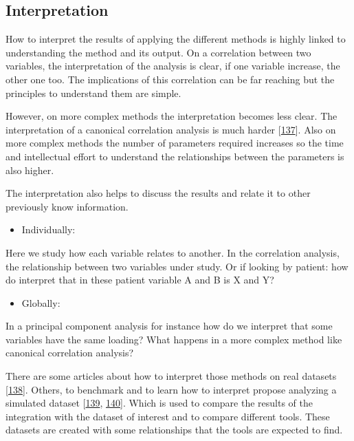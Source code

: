 \documentclass[
  a4paper,
]{book}
\providecommand{\tightlist}{%
  \setlength{\itemsep}{0pt}\setlength{\parskip}{0pt}}
\begin{document}
\hypertarget{interpretation}{%
\subsection{Interpretation}\label{interpretation}}

How to interpret the results of applying the different methods is highly linked to understanding the method and its output.
On a correlation between two variables, the interpretation of the analysis is clear, if one variable increase, the other one too.
The implications of this correlation can be far reaching but the principles to understand them are simple.

However, on more complex methods the interpretation becomes less clear.
The interpretation of a canonical correlation analysis is much harder {[}\protect\hyperlink{ref-sherry2005}{137}{]}.
Also on more complex methods the number of parameters required increases so the time and intellectual effort to understand the relationships between the parameters is also higher.

The interpretation also helps to discuss the results and relate it to other previously know information.

\begin{itemize}
\tightlist
\item
  Individually:
\end{itemize}

Here we study how each variable relates to another.
In the correlation analysis, the relationship between two variables under study.
Or if looking by patient: how do interpret that in these patient variable A and B is X and Y?

\begin{itemize}
\tightlist
\item
  Globally:
\end{itemize}

In a principal component analysis for instance how do we interpret that some variables have the same loading?
What happens in a more complex method like canonical correlation analysis?

There are some articles about how to interpret those methods on real datasets {[}\protect\hyperlink{ref-sherryConductingInterpretingCanonical1981}{138}{]}.
Others, to benchmark and to learn how to interpret propose analyzing a simulated dataset {[}\protect\hyperlink{ref-chung_multi-omics_2019}{139}, \protect\hyperlink{ref-martinez-mira_mosim_2018}{140}{]}.
Which is used to compare the results of the integration with the dataset of interest and to compare different tools.
These datasets are created with some relationships that the tools are expected to find.
\end{document}
